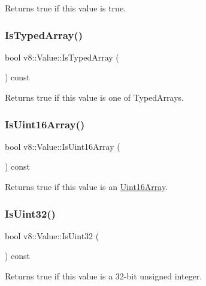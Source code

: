 Returns true if this value is true. \mbox{\label{classv8_1_1Value_a01183cf30ba5e6383cdca82daee630d8}} 
\subsubsection{\texorpdfstring{Is\+Typed\+Array()}{IsTypedArray()}}
{\footnotesize\ttfamily bool v8\+::\+Value\+::\+Is\+Typed\+Array (\begin{DoxyParamCaption}{ }\end{DoxyParamCaption}) const}

Returns true if this value is one of Typed\+Arrays. \mbox{\label{classv8_1_1Value_af3e8da420ddc0f92aac5dbfe61ac9699}} 
\subsubsection{\texorpdfstring{Is\+Uint16\+Array()}{IsUint16Array()}}
{\footnotesize\ttfamily bool v8\+::\+Value\+::\+Is\+Uint16\+Array (\begin{DoxyParamCaption}{ }\end{DoxyParamCaption}) const}

Returns true if this value is an \mbox{\hyperlink{classv8_1_1Uint16Array}{Uint16\+Array}}. \mbox{\label{classv8_1_1Value_ae30d50fb96b03239bc90ceb07b6e46fc}} 
\subsubsection{\texorpdfstring{Is\+Uint32()}{IsUint32()}}
{\footnotesize\ttfamily bool v8\+::\+Value\+::\+Is\+Uint32 (\begin{DoxyParamCaption}{ }\end{DoxyParamCaption}) const}

Returns true if this value is a 32-\/bit unsigned integer. \mbox{\label{classv8_1_1Value_a52fe549df18b0c77a875d7aa61f87317}} 
